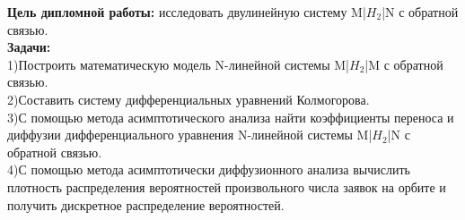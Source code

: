 \textbf{Цель дипломной работы:} исследовать двулинейную систему M|$H_{2}$|N с обратной связью.\\

\textbf{Задачи:}\\
1)Построить математическую модель N-линейной системы M|$H_{2}$|M с обратной связью.\\
2)Составить систему дифференциальных уравнений Колмогорова.\\
3)С помощью метода асимптотического анализа найти коэффициенты переноса и диффузии дифференциального уравнения N-линейной системы M|$H_{2}$|N с обратной связью.\\
4)С помощью метода асимптотически диффузионного анализа вычислить плотность распределения вероятностей произвольного числа заявок на орбите и получить дискретное распределение вероятностей.

\newpage